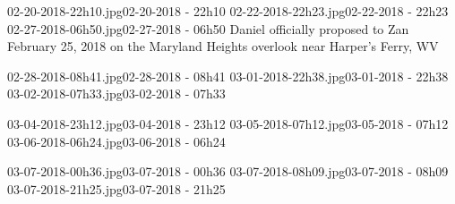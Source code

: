 ﻿\documentclass[letterpaper, 12pt, landscape]{ProgressBook}
\begin{document}
{02-20-2018-22h10.jpg}{02-20-2018 - 22h10}
{02-22-2018-22h23.jpg}{02-22-2018 - 22h23}
{02-27-2018-06h50.jpg}{02-27-2018 - 06h50}
{Daniel officially proposed to Zan February 25, 2018 on the Maryland Heights overlook near Harper's Ferry, WV }

{02-28-2018-08h41.jpg}{02-28-2018 - 08h41}
{03-01-2018-22h38.jpg}{03-01-2018 - 22h38}
{03-02-2018-07h33.jpg}{03-02-2018 - 07h33}

{03-04-2018-23h12.jpg}{03-04-2018 - 23h12}
{03-05-2018-07h12.jpg}{03-05-2018 - 07h12}
{03-06-2018-06h24.jpg}{03-06-2018 - 06h24}

{03-07-2018-00h36.jpg}{03-07-2018 - 00h36}
{03-07-2018-08h09.jpg}{03-07-2018 - 08h09}
{03-07-2018-21h25.jpg}{03-07-2018 - 21h25}
\end{document}
